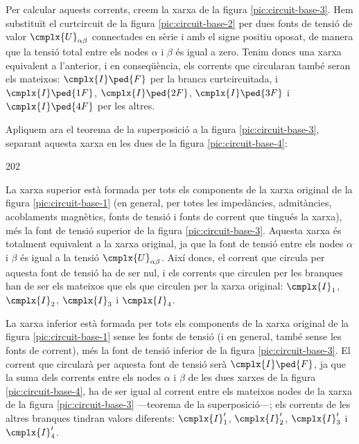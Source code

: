 \begin{center}
	
	\label{pic:circuit-base-2}
\end{center}


Per  calcular aquests corrents, creem  la xarxa de la figura  \vref{pic:circuit-base-3}. Hem substituït el curtcircuit de la  figura \vref{pic:circuit-base-2} per dues fonts de tensió de valor $\cmplx{U}_{\alpha\beta}$ connectades en sèrie i amb el signe positiu oposat, de manera que la tensió total entre els nodes $\alpha$ i $\beta$ és igual a zero. Tenim doncs una xarxa equivalent a l'anterior, i en conseqüència, els corrents que circularan també seran els mateixos: $\cmplx{I}\ped{F}$ per la branca curtcircuitada, i  $\cmplx{I}\ped{1F}$, $\cmplx{I}\ped{2F}$, $\cmplx{I}\ped{3F}$ i $\cmplx{I}\ped{4F}$ per les altres.

\begin{center}
	
	\label{pic:circuit-base-3}
\end{center}

Apliquem ara el teorema de la superposició a la figura \vref{pic:circuit-base-3}, separant aquesta xarxa en les dues de la figura \vref{pic:circuit-base-4}:

\begin{dingautolist}{202}
	\item La xarxa superior està formada per tots els  components de la xarxa original de la figura \vref{pic:circuit-base-1} (en general, per totes les impedàncies, admitàncies, acoblaments magnètics, fonts de tensió i fonts de corrent que tingués la xarxa), més la font de tensió superior de la figura \vref{pic:circuit-base-3}. Aquesta xarxa és totalment equivalent a la xarxa original, ja que la font de tensió entre els nodes $\alpha$ i $\beta$ és igual  a  la tensió $\cmplx{U}_{\alpha\beta}$. Així doncs, el corrent que circula per aquesta font de tensió ha de ser nul, i els corrents que circulen per les branques han de ser els mateixos que els que circulen per la xarxa original: $\cmplx{I}_1$, $\cmplx{I}_2$, $\cmplx{I}_3$ i $\cmplx{I}_4$.
	
	\item  La xarxa inferior està formada per tots els  components de la xarxa original de la figura \vref{pic:circuit-base-1} sense les fonts de tensió (i en general, també sense les fonts de corrent),  més la font de tensió inferior de la figura \vref{pic:circuit-base-3}. El corrent que circularà per aquesta font de tensió serà $\cmplx{I}\ped{F}$, ja que la suma dels corrents entre els nodes $\alpha$ i $\beta$ de les dues xarxes de la figura \vref{pic:circuit-base-4}, ha de ser igual al corrent entre els mateixos nodes  de la xarxa de la  figura \vref{pic:circuit-base-3} ---teorema de la superposició---; els corrents de les altres branques tindran valors diferents: $\cmplx{I}_1'$, $\cmplx{I}_2'$, $\cmplx{I}_3'$ i $\cmplx{I}_4'$.
\end{dingautolist}

